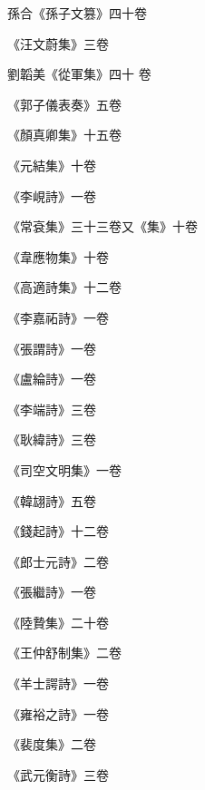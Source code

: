 \begin{pinyinscope}
 孫合《孫子文篡》四十卷



 《汪文蔚集》三卷



 劉韜美《從軍集》四十
 卷



 《郭子儀表奏》五卷



 《顏真卿集》十五卷



 《元結集》十卷



 《李峴詩》一卷



 《常袞集》三十三卷又《集》十卷



 《韋應物集》十卷



 《高適詩集》十二卷



 《李嘉祏詩》一卷



 《張謂詩》一卷



 《盧綸詩》一卷



 《李端詩》三卷



 《耿緯詩》三卷



 《司空文明集》一卷



 《韓翃詩》五卷



 《錢起詩》十二卷



 《郎士元詩》二卷



 《張繼詩》一卷



 《陸贄集》二十卷



 《王仲舒制集》二卷



 《羊士諤詩》一卷



 《雍裕之詩》一卷



 《裴度集》二卷



 《武元衡詩》三卷




\end{pinyinscope}
